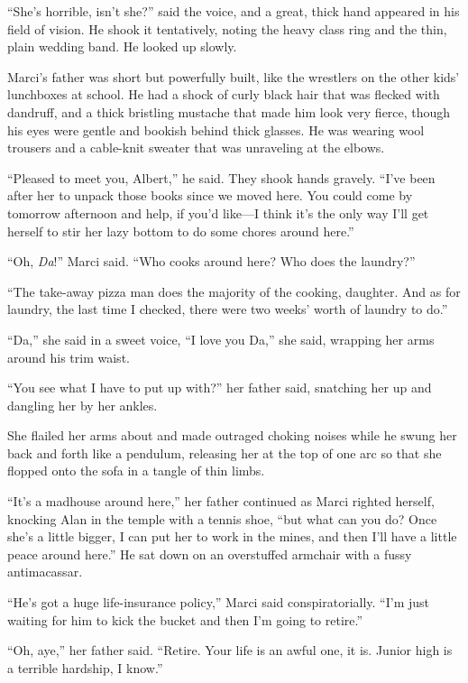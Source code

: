 ``She's horrible, isn't she?'' said the voice, and a great, thick hand
appeared in his field of vision.  He shook it tentatively, noting the
heavy class ring and the thin, plain wedding band.  He looked up
slowly.

Marci's father was short but powerfully built, like the wrestlers on
the other kids' lunchboxes at school.  He had a shock of curly black
hair that was flecked with dandruff, and a thick bristling mustache
that made him look very fierce, though his eyes were gentle and
bookish behind thick glasses.  He was wearing wool trousers and a
cable-knit sweater that was unraveling at the elbows.

``Pleased to meet you, Albert,'' he said.  They shook hands gravely. 
``I've been after her to unpack those books since we moved here.  You
could come by tomorrow afternoon and help, if you'd like---I think
it's the only way I'll get herself to stir her lazy bottom to do some
chores around here.''

``Oh, \textit{Da}!'' Marci said.  ``Who cooks around here?  Who does
the laundry?''

``The take-away pizza man does the majority of the cooking, daughter. 
And as for laundry, the last time I checked, there were two weeks'
worth of laundry to do.''

``Da,'' she said in a sweet voice, ``I love you Da,'' she said,
wrapping her arms around his trim waist.

``You see what I have to put up with?'' her father said, snatching her
up and dangling her by her ankles.

She flailed her arms about and made outraged choking noises while he
swung her back and forth like a pendulum, releasing her at the top of
one arc so that she flopped onto the sofa in a tangle of thin limbs.

``It's a madhouse around here,'' her father continued as Marci righted
herself, knocking Alan in the temple with a tennis shoe, ``but what
can you do?  Once she's a little bigger, I can put her to work in the
mines, and then I'll have a little peace around here.'' He sat down on
an overstuffed armchair with a fussy antimacassar.

``He's got a huge life-insurance policy,'' Marci said
conspiratorially.  ``I'm just waiting for him to kick the bucket and
then I'm going to retire.''

``Oh, aye,'' her father said.  ``Retire.  Your life is an awful one,
it is.  Junior high is a terrible hardship, I know.''

